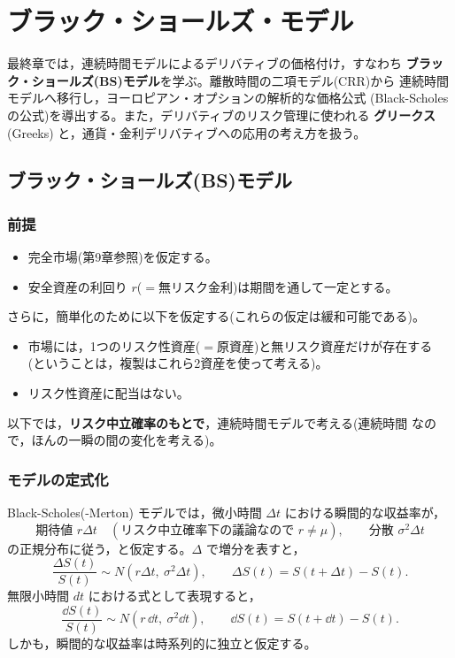 \chapter{ブラック・ショールズ・モデル}

最終章では，連続時間モデルによるデリバティブの価格付け，すなわち
\textbf{ブラック・ショールズ(BS)モデル}を学ぶ。離散時間の二項モデル(CRR)から
連続時間モデルへ移行し，ヨーロピアン・オプションの解析的な価格公式
(Black-Scholesの公式)を導出する。また，デリバティブのリスク管理に使われる
\textbf{グリークス} (Greeks) と，通貨・金利デリバティブへの応用の考え方を扱う。

\section{ブラック・ショールズ(BS)モデル}

\subsection{前提}

\begin{itemize}
\item 完全市場(第9章参照)を仮定する。
\item 安全資産の利回り $r$($=$無リスク金利)は期間を通して一定とする。
\end{itemize}
さらに，簡単化のために以下を仮定する(これらの仮定は緩和可能である)。
\begin{itemize}
\item 市場には，1つのリスク性資産($=$原資産)と無リスク資産だけが存在する
(ということは，複製はこれら2資産を使って考える)。
\item リスク性資産に配当はない。
\end{itemize}
以下では，\textbf{リスク中立確率のもとで}，連続時間モデルで考える(連続時間
なので，ほんの一瞬の間の変化を考える)。

\subsection{モデルの定式化}

Black-Scholes(-Merton) モデルでは，微小時間 $\Delta t$ における瞬間的な収益率が，
\[
\text{期待値 } r\Delta t \quad
(\text{リスク中立確率下の議論なので } r \neq \mu),\qquad
\text{分散 } \sigma^2\Delta t
\]
の正規分布に従う，と仮定する。$\Delta$ で増分を表すと，
\[
\frac{\Delta S(t)}{S(t)} \sim N(r\Delta t,\ \sigma^2\Delta t),
\qquad \Delta S(t) = S(t+\Delta t) - S(t).
\]
無限小時間 $dt$ における式として表現すると，
\[
\frac{\dd S(t)}{S(t)} \sim N(r\,\dd t,\ \sigma^2\dd t),
\qquad \dd S(t) = S(t+\dd t) - S(t).
\]
しかも，瞬間的な収益率は時系列的に独立と仮定する。

